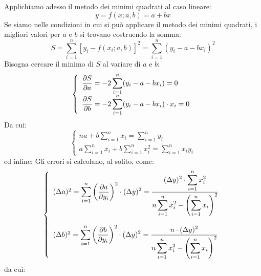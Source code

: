 Applichiamo adesso il metodo dei minimi quadrati al caso lineare:
$$
y = f(x; a, b) = a + b x
$$
Se siamo nelle condizioni in cui si pu\`o applicare il metodo dei
minimi quadrati, i migliori valori per $a$ e $b$ si trovano
costruendo la somma:
$$
S=\sum_{i=1}^n \left[ y_i - f(x_i; a, b) \right]^2 = 
\sum_{i=1}^n(y_i-a-b x_i)^2
$$
Bisogna cercare il minimo di $S$ al variare di $a$ e $b$:
$$
\left \{ \begin{array}{l}
\displaystyle \frac{\partial S}{\partial a} = -2\sum_{i=1}^{n}(y_i-a-b x_i) = 0\\
\displaystyle \frac{\partial S}{\partial b} = -2\sum_{i=1}^{n}(y_i-a-b x_i) \cdot x_i = 0
\end{array} \right.
$$
Da cui:
$$
\left \{ \begin{array}{l}
\displaystyle n a + b\sum_{i=1}^{n}x_i = \sum_{i=1}^{n}y_i\\
\displaystyle a\sum_{i=1}^{n}x_i + b \sum_{i=1}^{n}x_i^2 =
\sum_{i=1}^{n}x_i y_i
\end{array} \right.
$$
ed infine:
Gli errori si calcolano, al solito, come:
$$
\left \{ \begin{array}{l}
(\Delta a)^2=\displaystyle \sum_{i=1}^{n} \left(\displaystyle \frac{\partial a}{\partial y_i}\right)^2
\cdot (\Delta y)^2=
\frac{\displaystyle (\Delta y)^2 \cdot \sum_{i=1}^{n} x_i^2}
{\displaystyle n\sum_{i=1}^{n} x_i^2-\left(\sum_{i=1}^{n} x_i\right)^2}\\
\\
(\Delta b)^2=\displaystyle \sum_{i=1}^{n} \left(\displaystyle \frac{\partial b}{\partial y_i}\right)^2
\cdot (\Delta y)^2=
\frac{\displaystyle n \cdot (\Delta y)^2}
{\displaystyle n\sum_{i=1}^{n} x_i^2-\left(\sum_{i=1}^{n} x_i\right)^2}
\end{array} \right.
$$
da cui:


